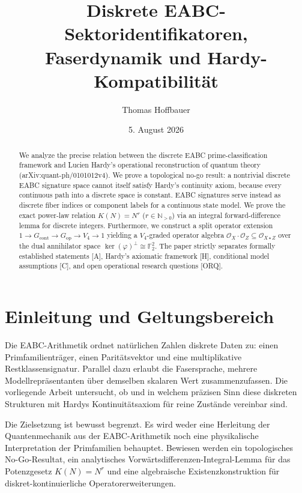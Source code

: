 \documentclass[11pt,a4paper,reqno]{amsart}
\title[Diskrete EABC-Sektoren und Hardy-Kompatibilit\"at]{Diskrete EABC-Sektoridentifikatoren, Faserdynamik und Hardy-Kompatibilit\"at}
\author{Thomas Hoffbauer}
\date{5. August 2026}
\theoremstyle{definition}
\theoremstyle{remark}
\begin{document}
	
	\begin{abstract}
		We analyze the precise relation between the discrete EABC prime-classification framework and Lucien Hardy's operational reconstruction of quantum theory (arXiv:quant-ph/0101012v4). We prove a topological no-go result: a nontrivial discrete EABC signature space cannot itself satisfy Hardy's continuity axiom, because every continuous path into a discrete space is constant. EABC signatures serve instead as discrete fiber indices or component labels for a continuous state model. We prove the exact power-law relation $K(N) = N^r$ ($r \in \mathbb{N}_{>0}$) via an integral forward-difference lemma for discrete integers. Furthermore, we construct a split operator extension $1 \to G_{\mathrm{cont}} \to G_{\mathrm{op}} \to V_4 \to 1$ yielding a $V_4$-graded operator algebra $\mathcal{O}_X \cdot \mathcal{O}_Z \subseteq \mathcal{O}_{X \star Z}$ over the dual annihilator space $\operatorname{ker}(\varphi)^\perp \cong \mathbb{F}_2^2$. The paper strictly separates formally established statements [A], Hardy's axiomatic framework [H], conditional model assumptions [C], and open operational research questions [ORQ].
	\end{abstract}
	
	\maketitle
	
	\section{Einleitung und Geltungsbereich}
	
	Die EABC-Arithmetik ordnet nat\"urlichen Zahlen diskrete Daten zu: einen Primfamilientr\"ager, einen Parit\"atsvektor und eine multiplikative Restklassensignatur. Parallel dazu erlaubt die Fasersprache, mehrere Modellrepr\"asentanten \"uber demselben skalaren Wert zusammenzufassen. Die vorliegende Arbeit untersucht, ob und in welchem pr\"azisen Sinn diese diskreten Strukturen mit Hardys Kontinuit\"atsaxiom f\"ur reine Zust\"ande vereinbar sind.
	
	Die Zielsetzung ist bewusst begrenzt. Es wird weder eine Herleitung der Quantenmechanik aus der EABC-Arithmetik noch eine physikalische Interpretation der Primfamilien behauptet. Bewiesen werden ein topologisches No-Go-Resultat, ein analytisches Vorw\"artsdifferenzen-Integral-Lemma f\"ur das Potenzgesetz $K(N)=N^r$ und eine algebraische Existenzkonstruktion f\"ur diskret-kontinuierliche Operatorerweiterungen.
	
\end{document}
